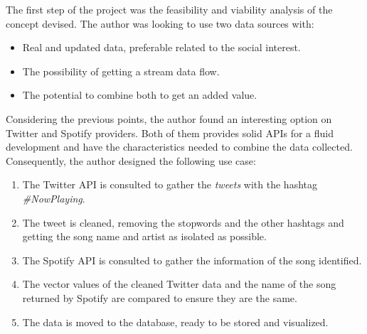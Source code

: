 

\nonzeroparskip The first step of the project was the feasibility and viability analysis of the concept devised. The author was looking to use two data sources with:

\begin{itemize}
	\item Real and updated data, preferable related to the social interest.
	\item The possibility of getting a stream data flow.
	\item The potential to combine both to get an added value.
\end{itemize}

\nonzeroparskip Considering the previous points, the author found an interesting option on Twitter and Spotify providers. Both of them provides solid APIs for a fluid development and have the characteristics needed to combine the data collected. Consequently, the author designed the following use case:

\begin{enumerate}
	\item The Twitter API is consulted to gather the \textit{tweets} with the hashtag \textit{\#NowPlaying}.
	\item The tweet is cleaned, removing the stopwords and the other hashtags and getting the song name and artist as isolated as possible.
	\item The Spotify API is consulted to gather the information of the song identified.
	\item The vector values of the cleaned Twitter data and the name of the song returned by Spotify are compared to ensure they are the same.
	\item The data is moved to the database, ready to be stored and visualized.
\end{enumerate}

